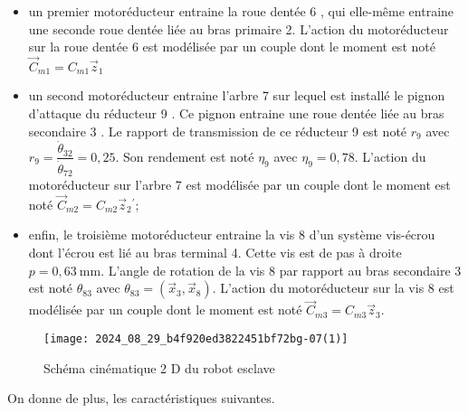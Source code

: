 \begin{itemize}
  \item un premier motoréducteur entraine la roue dentée 6 , qui elle-même entraine une seconde roue dentée liée au bras primaire 2. L'action du motoréducteur sur la roue dentée 6 est modélisée par un couple dont le moment est noté $\vec{C}_{m 1}=C_{m 1} \vec{z}_{1}$
  \item un second motoréducteur entraine l'arbre 7 sur lequel est installé le pignon d'attaque du réducteur 9 . Ce pignon entraine une roue dentée liée au bras secondaire 3 . Le rapport de transmission de ce réducteur 9 est noté $r_{9}$ avec $r_{9}=\dfrac{\dot{\theta}_{32}}{\dot{\theta}_{72}}=0,25$. Son rendement est noté $\eta_{9}$ avec $\eta_{9}=0,78$. L'action du motoréducteur sur l'arbre 7 est modélisée par un couple dont le moment est noté $\vec{C}_{m 2}=C_{m 2} \vec{z}_{2}{ }^{\prime}$;
  \item enfin, le troisième motoréducteur entraine la vis 8 d'un système vis-écrou dont l'écrou est lié au bras terminal 4. Cette vis est de pas à droite $p=0,63 \mathrm{~mm}$. L'angle de rotation de la vis 8 par rapport au bras secondaire 3 est noté $\theta_{83}$ avec $\theta_{83}=\left(\vec{x}_{3}, \vec{x}_{8}\right)$. L'action du motoréducteur sur la vis 8 est modélisée par un couple dont le moment est noté $\vec{C}_{m 3}=C_{m 3} \vec{z}_{3}$.
\end{itemize}


\begin{figure}[!h]
\centering
\texttt{[image: 2024\_08\_29\_b4f920ed3822451bf72bg-07(1)]}
\caption{\label{fig_07} Schéma cinématique 2 D du robot esclave}
\end{figure}

On donne de plus, les caractéristiques suivantes.

